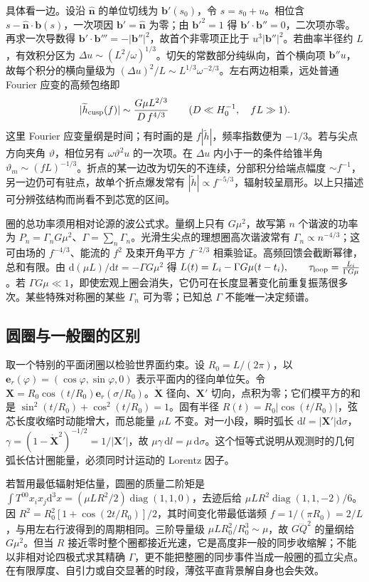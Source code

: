 具体看一边。设沿 $\hat{\bm n}$ 的单位切线为 $\bm b'(s_0)$，令 $s=s_0+u$。相位含 $s-\hat{\bm n}\cdot\bm b(s)$，一次项因 $\bm b'=\hat{\bm n}$ 为零；由 $\bm b'^2=1$ 得 $\bm b'\cdot\bm b''=0$，二次项亦零。再求一次导数得 $\bm b'\cdot\bm b'''=-|\bm b''|^2$，故首个非零项正比于 $u^3|\bm b''|^2$。若曲率半径约 $L$，有效积分区为 $\Delta u\sim(L^2/\omega)^{1/3}$。切矢的常数部分纯纵向，首个横向项 $\bm b''u$，故每个积分的横向量级为 $(\Delta u)^2/L\sim L^{1/3}\omega^{-2/3}$。左右两边相乘，远处普通 Fourier 应变的高频包络即
\[
 |\widetilde h_{\rm cusp}(f)|\sim
 \frac{G\mu L^{2/3}}{D\, f^{4/3}}
 \qquad(D\ll H_0^{-1},\quad fL\gg1).
\]
这里 Fourier 应变量纲是时间；有时画的是 $f|\widetilde h|$，频率指数便为 $-1/3$。若与尖点方向夹角 $\vartheta$，相位另有 $\omega\vartheta^2 u$ 的一次项。在 $\Delta u$ 内小于一的条件给锥半角 $\vartheta_m\sim(fL)^{-1/3}$。折点的某一边改为切矢的不连续，分部积分给端点幅度 $\sim f^{-1}$，另一边仍可有驻点，故单个折点爆发常有 $|\widetilde h|\propto f^{-5/3}$，辐射较呈扇形。以上只描述可分辨弦结构而尚看不到芯宽的区间。

圈的总功率须用相对论源的波公式求。量纲上只有 $G\mu^2$，故写第 $n$ 个谐波的功率为 $P_n=\Gamma_nG\mu^2$、$\Gamma=\sum_n\Gamma_n$。光滑生尖点的理想圈高次谐波常有 $\Gamma_n\propto n^{-4/3}$；这可由场的 $f^{-4/3}$、能流的 $f^2$ 及束开角平方 $f^{-2/3}$ 相乘验证。高频回馈会截断幂律，总和有限。由 $\mathrm d(\mu L)/\mathrm dt=-\Gamma G\mu^2$ 得 $L(t)=L_i-\Gamma G\mu(t-t_i),\qquad \tau_{\rm loop}=\frac{L_i}{\Gamma G\mu}$。若 $\Gamma G\mu\ll1$，即使宏观上圈会消失，它仍可在长度显著变化前重复振荡很多次。某些特殊对称圈的某些 $\Gamma_n$ 可为零；已知总 $\Gamma$ 不能唯一决定频谱。


\subsection{圆圈与一般圈的区别}

取一个特别的平面闭圈以检验世界面约束。设 $R_0=L/(2\pi)$，以 $\bm e_r(\varphi)=(\cos\varphi,\sin\varphi,0)$ 表示平面内的径向单位矢。令 $\bm X=R_0\cos(t/R_0)\bm e_r(\sigma/R_0)$。$\dot{\bm X}$ 径向、$\bm X'$ 切向，点积为零；它们模平方的和是 $\sin^2(t/R_0)+\cos^2(t/R_0)=1$。固有半径 $R(t)=R_0|\cos(t/R_0)|$，弦芯长度收缩时动能增大，而总能量 $\mu L$ 不变。对一小段，瞬时弧长 $\mathrm dl=|\bm X'|\mathrm d\sigma$，$\gamma=(1-\dot{\bm X}^2)^{-1/2}=1/|\bm X'|$，故 $\mu\gamma\,\mathrm dl=\mu\,\mathrm d\sigma$。这个恒等式说明从观测时的几何弧长估计圈能量，必须同时计运动的 Lorentz 因子。

若暂用最低辐射矩估量，圆圈的质量二阶矩是 $\int T^{00}x_ix_j\mathrm d^3x=(\mu L R^2/2)\operatorname{diag}(1,1,0)$，去迹后给 $\mu L R^2\operatorname{diag}(1,1,-2)/6$。因 $R^2=R_0^2[1+\cos(2t/R_0)]/2$，其时间变化带最低谐频 $f=1/(\pi R_0)=2/L$，与用左右行波得到的周期相同。三阶导量级 $\mu LR_0^2/R_0^3\sim\mu$，故 $G\dddot Q^2$ 的量纲给 $G\mu^2$。但当 $R$ 接近零时整个圈都接近光速，它是高度非一般的同步收缩解；不能以非相对论四极式求其精确 $\Gamma$，更不能把整圈的同步事件当成一般圈的孤立尖点。在有限厚度、自引力或自交显著的时段，薄弦平直背景解自身也会失效。
